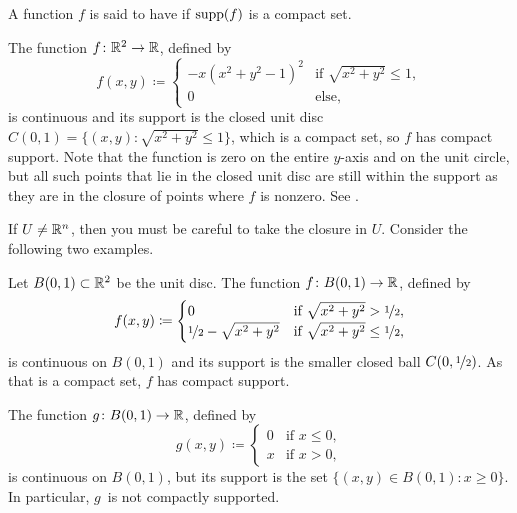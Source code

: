 A function $f$ is said to have \emph{}
if $\operatorname{supp}(f)$ is a compact set.

\begin{example}
The function $f \colon {\mathbb{R}}^2 \to {\mathbb{R}}$, defined by
\begin{equation*}
f(x,y) \coloneqq
\begin{cases}
-x{(x^2+y^2-1)}^2 & \text{if } \sqrt{x^2+y^2} \leq 1, \\
0                 & \text{else},
\end{cases}
\end{equation*}
is continuous and its support is the closed unit disc
$C(0,1) = \bigl\{ (x,y) : \sqrt{x^2 + y^2} \leq 1 \bigr\}$, which is a compact set, so $f$ has compact support.
Note that the function is zero on the entire $y$-axis
and on the unit circle, but
all such points that lie in the closed unit disc are still within the support
as they are in the closure of points where $f$ is nonzero.
See .
\begin{myfigureht}
\caption{Function with compact support (left), the support
is the closed unit disc (right).\label{fig:compsup}}
\end{myfigureht}
\end{example}

If $U \neq {\mathbb{R}}^n$, then you must be careful to
take the closure in $U$.  Consider the following
two examples.

\begin{example}
Let 
$B(0,1) \subset {\mathbb{R}}^2$ be the unit disc.  The function
$f \colon B(0,1) \to {\mathbb{R}}$, defined by
\begin{equation*}
f(x,y) \coloneqq
\begin{cases}
0                                & \text{if } \sqrt{x^2+y^2} > \nicefrac{1}{2}, \\
\nicefrac{1}{2} - \sqrt{x^2+y^2} & \text{if } \sqrt{x^2+y^2} \leq \nicefrac{1}{2},
\end{cases}
\end{equation*}
is continuous on $B(0,1)$ and its support is the smaller closed ball
$C(0,\nicefrac{1}{2})$.  As that is a compact set, $f$ has compact support.

The function $g \colon B(0,1) \to {\mathbb{R}}$, defined by
\begin{equation*}
g(x,y) \coloneqq
\begin{cases}
0 & \text{if } x \leq 0, \\
x & \text{if } x > 0,
\end{cases}
\end{equation*}
is continuous on $B(0,1)$, but its support is the set
$\bigl\{ (x,y) \in B(0,1) : x \geq 0 \bigr\}$.  In particular, $g$~is not compactly
supported.
\end{example}

